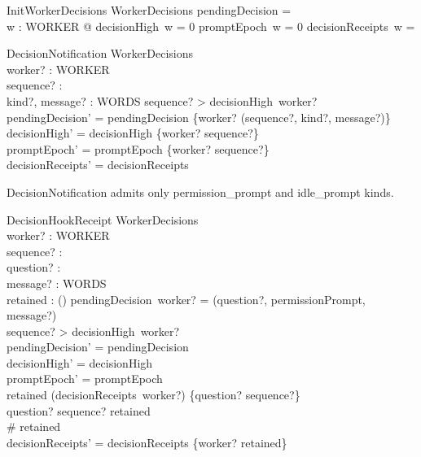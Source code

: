 \documentclass[a4paper,10pt,fleqn]{article}
\begin{document}
\begin{schema}{InitWorkerDecisions}
  WorkerDecisions
\where
  pendingDecision = \emptyset \\
  \forall w : WORKER @ decisionHigh~w = 0 \land promptEpoch~w = 0 \land
    decisionReceipts~w = \emptyset
\end{schema}

\begin{schema}{DecisionNotification}
  \Delta WorkerDecisions \\
  worker? : WORKER \\
  sequence? : \nat \\
  kind?, message? : WORDS
\where
  sequence? > decisionHigh~worker? \\
  pendingDecision' = pendingDecision \oplus
    \{worker? \mapsto (sequence?, kind?, message?)\} \\
  decisionHigh' = decisionHigh \oplus \{worker? \mapsto sequence?\} \\
  promptEpoch' = promptEpoch \oplus \{worker? \mapsto sequence?\} \\
  decisionReceipts' = decisionReceipts
\end{schema}

DecisionNotification admits only permission\_prompt and idle\_prompt kinds.

\begin{schema}{DecisionHookReceipt}
  \Delta WorkerDecisions \\
  worker? : WORKER \\
  sequence? : \nat \\
  question? : \nat \\
  message? : WORDS \\
  retained : \power (\nat \cross \nat)
\where
  pendingDecision~worker? = (question?, permissionPrompt, message?) \\
  sequence? > decisionHigh~worker? \\
  pendingDecision' = pendingDecision \\
  decisionHigh' = decisionHigh \\
  promptEpoch' = promptEpoch \\
  retained \subseteq (decisionReceipts~worker?) \cup \{question? \mapsto sequence?\} \\
  question? \mapsto sequence? \in retained \\
  \# retained  \\
  decisionReceipts' = decisionReceipts \oplus \{worker? \mapsto retained\}
\end{schema}
\end{document}
